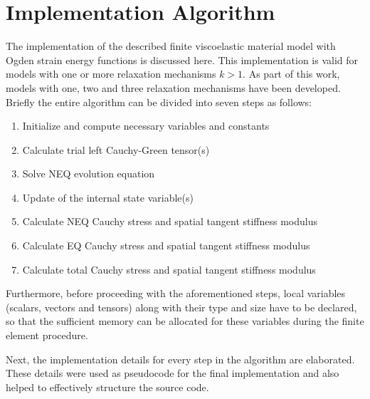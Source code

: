 \section{Implementation Algorithm}
\label{sec:implementation_algorithm}
The implementation of the described finite viscoelastic material model with Ogden strain energy functions is discussed here. This implementation is valid for models with one or more relaxation mechanisms \(k>1\). As part of this work, models with one, two and three relaxation mechanisms have been developed.  Briefly the entire algorithm can be divided into seven steps as follows:
\begin{enumerate}[label=\emph{Step \arabic*}]
    \addtolength{\itemindent}{0.8cm}%
    \item Initialize and compute necessary variables and constants
    \item Calculate trial left Cauchy-Green tensor(s)
    \item Solve NEQ evolution equation
    \item Update of the internal state variable(s)
    \item Calculate NEQ Cauchy stress and spatial tangent stiffness modulus
    \item Calculate EQ Cauchy stress and spatial tangent stiffness modulus
    \item Calculate total Cauchy stress and spatial tangent stiffness modulus
\end{enumerate}

Furthermore, before proceeding with the aforementioned steps, local variables (scalars, vectors and tensors) along with their type and size have to be declared, so that the sufficient memory can be allocated for these variables during the finite element procedure. 

Next, the implementation details for every step in the algorithm are elaborated. These details were used as pseudocode for the final implementation and also helped to effectively structure the source code.

